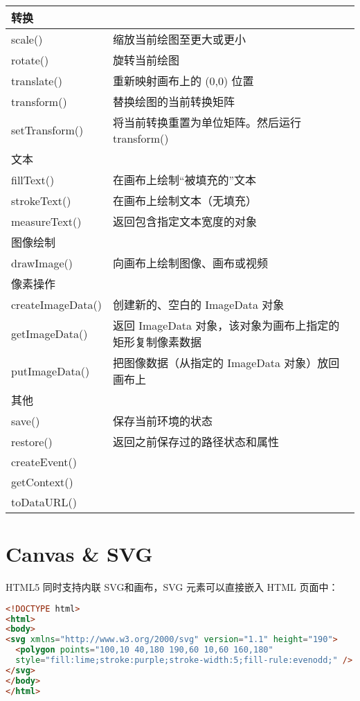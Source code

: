 \begin{longtable}{|p{120pt}|p{270pt}|}
\hline
\multicolumn{2}{|l|}{转换}\\
\hline
scale()				&缩放当前绘图至更大或更小\\
\hline
rotate()				&旋转当前绘图\\
\hline
translate()			&重新映射画布上的 (0,0) 位置\\
\hline
transform()			&替换绘图的当前转换矩阵\\
\hline
setTransform()		&将当前转换重置为单位矩阵。然后运行 transform()\\
\hline
\multicolumn{2}{|l|}{文本}\\
\hline
fillText()				&在画布上绘制“被填充的”文本\\
\hline
strokeText()			&在画布上绘制文本（无填充）\\
\hline
measureText()			&返回包含指定文本宽度的对象\\
\hline
\multicolumn{2}{|l|}{图像绘制}\\
\hline
drawImage()			&向画布上绘制图像、画布或视频\\
\hline
\multicolumn{2}{|l|}{像素操作}\\
\hline
createImageData()		&创建新的、空白的 ImageData 对象\\
\hline
getImageData()		&返回 ImageData 对象，该对象为画布上指定的矩形复制像素数据\\
\hline
putImageData()		&把图像数据（从指定的 ImageData 对象）放回画布上\\
\hline
\multicolumn{2}{|l|}{其他}\\
\hline
save()				&保存当前环境的状态\\
\hline
restore()				&返回之前保存过的路径状态和属性\\
\hline
createEvent()	 		&		\\
\hline
getContext()	 		&		\\
\hline
toDataURL()	 		&		\\
\hline
\end{longtable}

\section{Canvas \& SVG}




HTML5 同时支持内联 SVG和画布，SVG 元素可以直接嵌入 HTML 页面中：

\begin{lstlisting}[language=HTML]
<!DOCTYPE html>
<html>
<body>
<svg xmlns="http://www.w3.org/2000/svg" version="1.1" height="190">
  <polygon points="100,10 40,180 190,60 10,60 160,180"
  style="fill:lime;stroke:purple;stroke-width:5;fill-rule:evenodd;" />
</svg>
</body>
</html>
\end{lstlisting}


